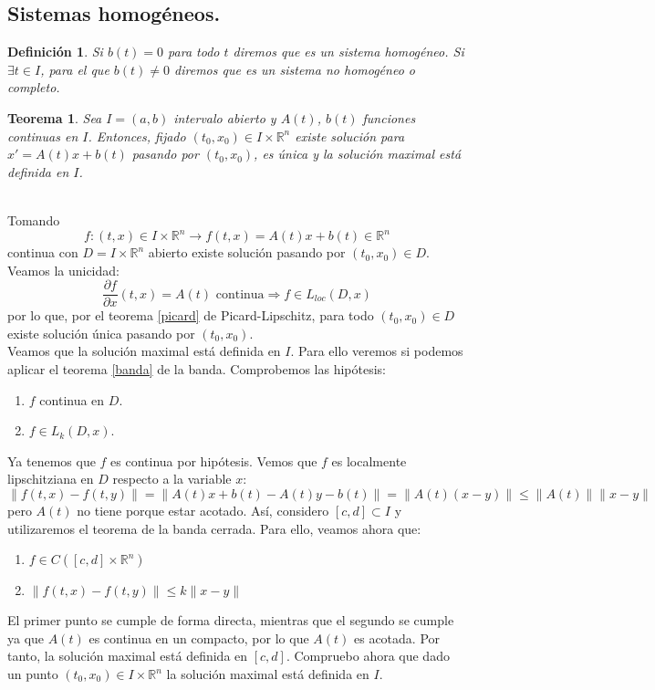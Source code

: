 \documentclass{article}
\makeatletter
\providecommand{\norm}[1]{\lVert#1\rVert}
\theoremstyle{theorem-style}  %
\newtheorem{theorem}{Teorema}[section]  %
\theoremstyle{definition-style}
\newtheorem{definition}{Definición}[section]
\theoremstyle{example-style}
\renewenvironment{proof}[1][\proofname]{\par
	\pushQED{\qed}%
	\normalfont \topsep6\p@\@plus6\p@\relax
	\list{}{%
		\settowidth{\leftmargin}{\quad:\hskip\labelsep}%
		\setlength{\labelwidth}{0pt}%
		\setlength{\itemindent}{-\leftmargin}%
	}%
	\item[\hskip\labelsep\itshape#1\@addpunct{:}]\ignorespaces
}{%
	\popQED\endlist\@endpefalse
}
\makeatother
\begin{document}
\subsection{Sistemas homogéneos.}
\begin{definition}
	Si $b(t) = 0$ para todo $ t $ diremos que es un \emph{sistema homogéneo}. Si $\exists t \in I$, para el que $ b(t)\neq0 $ diremos que es un \emph{sistema no homogéneo o completo}.
\end{definition}
\begin{theorem}
	Sea $I = (a, b)$ intervalo abierto y $A(t)$, $b(t)$ funciones continuas en $I$. Entonces, fijado $(t_0, x_0) \in I \times \mathbb{R}^n$ existe solución para $x'= A(t)x + b(t)$ pasando por $(t_0, x_0)$, es única y la solución maximal está definida en $ I $.
\end{theorem}
\begin{proof}\ \\
	Tomando
	\[f:(t, x) \in I \times \mathbb{R}^n \longrightarrow f(t,x)=A(t)x+b(t)\in\mathbb{R}^n\]
	continua con $D = I \times \mathbb{R}^n$ abierto existe solución pasando por $(t_0, x_0) \in D$. Veamos la unicidad:
	\[\frac{\partial f}{\partial x} (t, x) = A(t) \text{ continua} \Rightarrow f \in L_{loc} (D, x)\]
	por lo que, por el teorema \ref{picard} de Picard-Lipschitz, para todo $ (t_0, x_0) \in D$ existe solución única pasando por $(t_0, x_0)$. \\
	Veamos que la solución maximal está definida en $I$. Para ello veremos si podemos aplicar el teorema \ref{banda} de la banda. Comprobemos las hipótesis:
	\begin{enumerate}
		\item $f$ continua en $D$.
		\item $f \in L_k (D, x)$.
	\end{enumerate}
	Ya tenemos que $f$ es continua por hipótesis. Vemos que $f$ es localmente lipschitziana en $D$ respecto a la variable $x$:
	\[\norm{f(t, x) - f(t, y)} = \norm{A(t)x + b(t) - A(t)y - b(t)} = \norm{A(t) (x-y)} \leq \norm{A(t)} \norm{x - y} \]
	pero $A(t)$ no tiene porque estar acotado. Así, considero $[c, d] \subset I$ y utilizaremos el teorema de la banda cerrada. Para ello, veamos ahora que:
	\begin{enumerate}
		\item $f \in C([c, d] \times \mathbb{R}^n)$
		\item $\norm{f(t, x) - f(t, y)} \leq k \norm{x - y}$
	\end{enumerate}
El primer punto se cumple de forma directa, mientras que el segundo se cumple ya que $A(t)$ es continua en un compacto, por lo que $A(t)$ es acotada. Por tanto, la solución maximal está definida en $[c, d]$. Compruebo ahora que dado un punto $(t_0, x_0) \in I \times \mathbb{R}^n$ la solución maximal está definida en $I$. \\

\end{proof}
\end{document}
